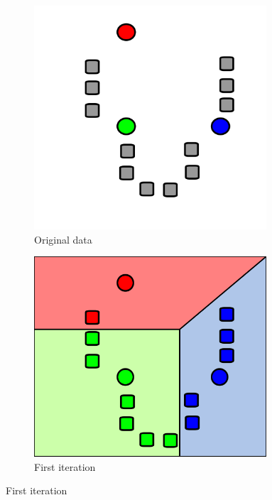 \documentclass{report}
\begin{document}
\begin{figure}
    \centering
    \begin{subfigure}{0.3\textwidth}
        \includegraphics[width=0.95\textwidth]{kmean1.png}
        \caption{Original data}
    \end{subfigure}
    \begin{subfigure}{0.3\textwidth}
        \includegraphics[width=0.95\textwidth]{kmean2.png}
        \caption{First iteration}
    \end{subfigure}

\end{figure}
\end{document}
